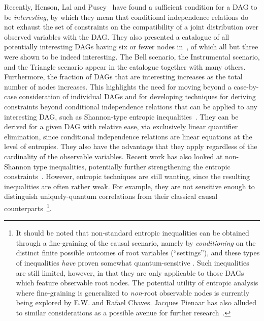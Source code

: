 Recently, Henson, Lal and Pusey~\cite{pusey2014gdag} have found a sufficient condition for a DAG to be {\em interesting}, by which they mean that conditional independence relations do not exhaust the set  of constraints on the compatibility of a joint distribution over observed variables with the DAG. They also presented a catalogue of all potentially interesting DAGs having six or fewer nodes in~\cite[App.~E]{pusey2014gdag}, of which all but three were shown to be indeed interesting. The Bell scenario, the Instrumental scenario, and the Triangle scenario appear in the catalogue together with many others.   Furthermore, the fraction of DAGs that are interesting increases as the total number of nodes increases.  This highlights the need for moving beyond a case-by-case consideration of individual DAGs and for developing techniques for deriving constraints beyond conditional independence relations that can be applied to any interesting DAG, such as Shannon-type entropic inequalities~\cite{steudel2010ancestors,fritz2012bell,fritz2013marginal,chaves2014novel,chaves2014informationinference}. They can be derived for a given DAG with relative ease, via exclusively linear quantifier elimination, since conditional independence relations are linear equations at the level of entropies. They also have the advantage that they apply regardless of the cardinality of the observable variables. Recent work has also looked at non-Shannon type inequalities, potentially further strengthening the entropic constraints~\cite{weilenmann2016entropic,pianaar2016interesting}. However, entropic techniques are still wanting, since the resulting inequalities are often rather weak. For example, they are not sensitive enough to distinguish uniquely-quantum correlations from their classical causal counterparts~\cite{fritz2012bell,weilenmann2016entropic}\footnote{It should be noted that non-standard entropic inequalities can be obtained through a fine-graining of the causal scenario, namely by \emph{conditioning} on the distinct finite possible outcomes of root variables (``settings''), and these types of inequalities \emph{have} proven somewhat quantum-sensitive \cite{braunstein1988entropic,SchumacherInequality,chaves2014novel}. Such inequalities are still limited, however, in that they are only applicable to those DAGs which feature observable root nodes. The potential utility of entropic analysis where fine-graining is generalized to \emph{non}-root observable nodes is currently being explored by E.W. and Rafael Chaves. Jacques Pienaar has also alluded to similar considerations as a possible avenue for further research~\cite{pianaar2016interesting}.}.


